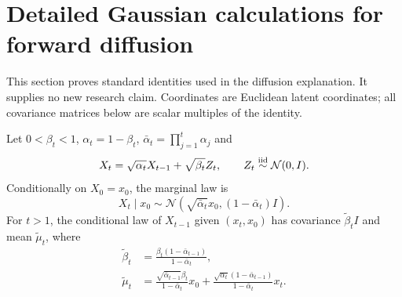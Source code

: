 \section{Detailed Gaussian calculations for forward diffusion}
This section proves standard identities used in the diffusion explanation. It supplies no new research claim. Coordinates are Euclidean latent coordinates; all covariance matrices below are scalar multiples of the identity.

\begin{proposition}
Let $0<\beta_t<1$, $\alpha_t=1-\beta_t$, $\bar\alpha_t=\prod_{j=1}^t\alpha_j$ and
\begin{equation}
 X_t=\sqrt{\alpha_t}X_{t-1}+\sqrt{\beta_t}Z_t,\qquad Z_t\overset{\rm iid}{\sim}\mathcal N(0,I).
\end{equation}
Conditionally on $X_0=x_0$, the marginal law is
\begin{equation}
 X_t\mid x_0\sim\mathcal N(\sqrt{\bar\alpha_t}x_0,(1-\bar\alpha_t)I).
\end{equation}
For $t>1$, the conditional law of $X_{t-1}$ given $(x_t,x_0)$ has covariance $\widetilde\beta_tI$ and mean $\widetilde\mu_t$, where
\begin{align}
 \widetilde\beta_t&=\frac{\beta_t(1-\bar\alpha_{t-1})}{1-\bar\alpha_t},\\
 \widetilde\mu_t&=
 \frac{\sqrt{\bar\alpha_{t-1}}\beta_t}{1-\bar\alpha_t}x_0+
 \frac{\sqrt{\alpha_t}(1-\bar\alpha_{t-1})}{1-\bar\alpha_t}x_t.
\end{align}
\end{proposition}
